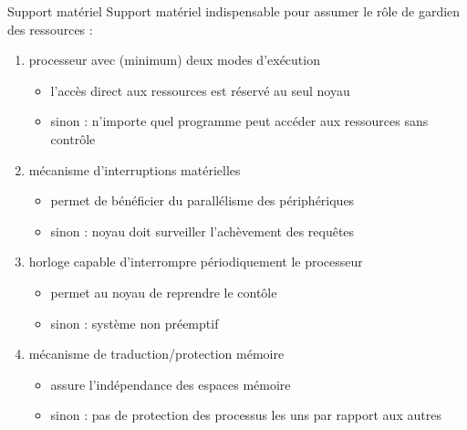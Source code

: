 \begin {frame} {Support matériel}
    Support matériel indispensable pour assumer le rôle de gardien
    des ressources :

    \begin {enumerate}
	\item processeur avec (minimum) deux modes d'exécution

	    \begin {itemize}
		\item l'accès direct aux ressources est réservé au seul
		    noyau
		\item sinon : n'importe quel programme peut accéder
		    aux ressources sans contrôle
	    \end {itemize}

	\item mécanisme d'interruptions matérielles

	    \begin {itemize}
		\item permet de bénéficier du parallélisme des
		    périphériques
		\item sinon : noyau doit surveiller l'achèvement
		    des requêtes

	    \end {itemize}

	\item horloge capable d'interrompre périodiquement le processeur

	    \begin {itemize}
		\item permet au noyau de reprendre le contôle
		\item sinon : système non préemptif
	    \end {itemize}

	\item mécanisme de traduction/protection mémoire

	    \begin {itemize}
		\item assure l'indépendance des espaces mémoire
		\item sinon : pas de protection des processus les uns par
		    rapport aux autres
	    \end {itemize}

    \end {enumerate}

\end {frame}

